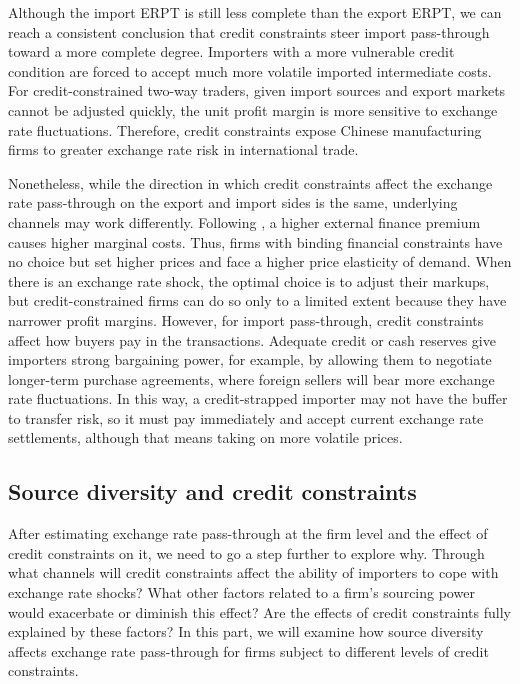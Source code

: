 Although the import ERPT is still less complete than the export ERPT, we can reach a consistent conclusion that credit constraints steer import pass-through toward a more complete degree.  Importers with a more vulnerable credit condition are forced to accept much more volatile imported intermediate costs. For credit-constrained two-way traders, given import sources and export markets cannot be adjusted quickly, the unit profit margin is more sensitive to exchange rate fluctuations. Therefore, credit constraints expose Chinese manufacturing firms to greater exchange rate risk in international trade.

Nonetheless, while the direction in which credit constraints affect the exchange rate pass-through on the export and import sides is the same, underlying channels may work differently. Following \cite{strasser2013}, a higher external finance premium causes higher marginal costs. Thus, firms with binding financial constraints have no choice but set higher prices and face a higher price elasticity of demand. When there is an exchange rate shock, the optimal choice is to adjust their markups, but credit-constrained firms can do so only to a limited extent because they have narrower profit margins. However, for import pass-through, credit constraints affect how buyers pay in the transactions. Adequate credit or cash reserves give importers strong bargaining power, for example, by allowing them to negotiate longer-term purchase agreements, where foreign sellers will bear more exchange rate fluctuations. In this way, a credit-strapped importer may not have the buffer to transfer risk, so it must pay immediately and accept current exchange rate settlements, although that means taking on more volatile prices.

\subsection{Source diversity and credit constraints}

After estimating exchange rate pass-through at the firm level and the effect of credit constraints on it, we need to go a step further to explore why. Through what channels will credit constraints affect the ability of importers to cope with exchange rate shocks? What other factors related to a firm's sourcing power would exacerbate or diminish this effect? Are the effects of credit constraints fully explained by these factors? In this part, we will examine how source diversity affects exchange rate pass-through for firms subject to different levels of credit constraints.

